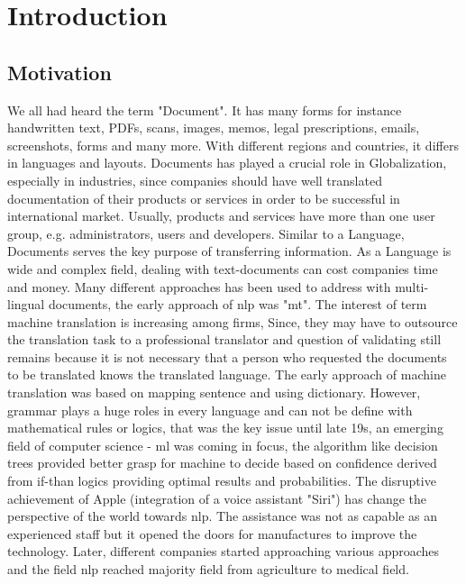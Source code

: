 \chapter{Introduction}

\section{Motivation}

\large We all had heard the term "Document". It has many forms for instance handwritten text, PDFs, scans, images, memos, legal prescriptions, emails, screenshots, forms and many more. With different regions and countries, it differs in languages and layouts. Documents has played a crucial role in Globalization, especially in industries, since companies should have well translated documentation of their products or services in order to be successful in international market. Usually, products and services have more than one user group, e.g. administrators, users and developers. Similar to a Language, Documents serves the key purpose of transferring information. As a Language is wide and complex field, dealing with text-documents can cost companies time and money. Many different approaches has been used to address with multi-lingual documents, the early approach of \acrlong{nlp} was "\acrlong{mt}". The interest of term machine translation is increasing among firms, Since, they may have to outsource the translation task to a professional translator and question of validating still remains because it is not necessary that a person who requested the documents to be translated knows the translated language. The early approach of machine translation was based on mapping sentence and using dictionary. However, grammar plays a huge roles in every language and can not be define with mathematical rules or logics, that was the key issue until late 19s, an emerging field of computer science - \acrfull{ml} was coming in focus, the algorithm like decision trees provided better grasp for machine to decide based on confidence derived from if-than logics providing optimal results and probabilities. The disruptive achievement of Apple (integration of a voice assistant "Siri") has change the perspective of the world towards \acrshort{nlp}. The assistance was not as capable as an experienced staff but it opened the doors for manufactures to improve the technology. Later, different companies started approaching various approaches and the field \acrshort{nlp} reached majority field from agriculture to medical field.


